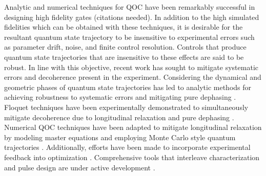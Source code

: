 Analytic and numerical techniques for QOC have been remarkably successful in
designing high fidelity gates (citations needed). In addition to the high
simulated fidelities which can be obtained with these techniques, it is desirable for the
resultant quantum state trajectory to be insensitive to experimental errors
such as parameter drift, noise, and finite control resolution. Controls that produce
quantum state trajectories that are insensitive to these effects are said to be robust.
In line with this objective, recent work has sought to mitigate systematic errors
and decoherence present in the experiment.
Considering the dynamical and geometric phases of quantum state
trajectories has led to analytic methods for achieving
robustness to systematic errors and mitigating pure dephasing
\cite{han2020experimental, merrill2014progress, xu2020nonadiabatic, zhang2020universal}.
Floquet techniques have been experimentally demonstrated to simultaneously mitigate
decoherence due to longitudinal relaxation and pure dephasing
\cite{huang2020engineering, mundada2020floquet}.
Numerical QOC techniques have been adapted to mitigate longitudinal relaxation
by modeling master equations \cite{rembold2020introduction} and employing
Monte Carlo style quantum trajectories \cite{abdelhafez2019gradient}.
Additionally, efforts have been made to incorporate experimental feedback
into optimization \cite{huang2020engineering}. Comprehensive tools that interleave characterization
and pulse design are under active development \cite{wittler2020integrated}.

